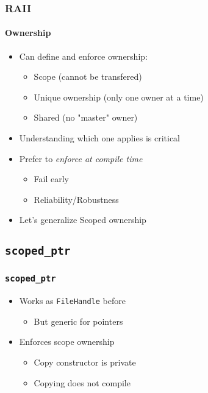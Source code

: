 \begin{frame}
    \frametitle{RAII}
    \framesubtitle{Ownership}
    \begin{itemize}
        \item Can define and enforce ownership:
            \begin{itemize}
                \item Scope (cannot be transfered)
                \item Unique ownership (only one owner at a time)
                \item Shared (no "master" owner)
            \end{itemize}
        \item Understanding which one applies is critical
        \item Prefer to \emph{enforce at compile time}
            \begin{itemize}
                \item Fail early
                \item Reliability/Robustness
            \end{itemize}
        \item Let's generalize Scoped ownership
    \end{itemize}
\end{frame}

\subsection{\texttt{scoped\_ptr}}
\frame{\subsectionpage}

\begin{frame}
    \frametitle{\texttt{scoped\_ptr}}
    \begin{itemize}
        \item Works as \texttt{FileHandle} before
            \begin{itemize}
                \item But generic for pointers
            \end{itemize}
        \item Enforces scope ownership
            \begin{itemize}
                \item Copy constructor is private
                \item Copying does not compile
            \end{itemize}
    \end{itemize}
\end{frame}

